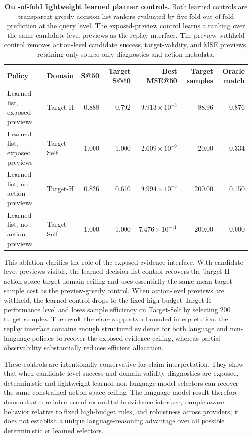 \documentclass[final,1p,times]{elsarticle}
\begin{document}
\begin{table}[htbp!]
\centering
\caption{\textbf{Out-of-fold lightweight learned planner controls.}
Both learned controls are transparent greedy decision-list rankers evaluated by five-fold out-of-fold prediction at the query level. The exposed-preview control learns a ranking over the same candidate-level previews as the replay interface. The preview-withheld control removes action-level candidate success, target-validity, and MSE previews, retaining only source-only diagnostics and action metadata.}
\label{tab:si_learned_preview_withheld_controls}
\small
\setlength{\tabcolsep}{4.2pt}
\renewcommand{\arraystretch}{1.12}
\begin{tabular}{llrrrrr}
\toprule
Policy & Domain & S@50 & Target S@50 & Best MSE@50 & Target samples & Oracle match \\
\midrule
Learned list, exposed previews & Target-H & 0.888 & 0.792 & $9.913\times10^{-3}$ & 88.96 & 0.876 \\
Learned list, exposed previews & Target-Self & 1.000 & 1.000 & $2.609\times10^{-9}$ & 20.00 & 0.334 \\
Learned list, no action previews & Target-H & 0.826 & 0.610 & $9.994\times10^{-3}$ & 200.00 & 0.150 \\
Learned list, no action previews & Target-Self & 1.000 & 1.000 & $7.476\times10^{-11}$ & 200.00 & 0.000 \\
\bottomrule
\end{tabular}
\end{table}

This ablation clarifies the role of the exposed evidence interface. With candidate-level previews visible, the learned decision-list control recovers the Target-H action-space target-domain ceiling and uses essentially the same mean target-sample cost as the preview-greedy control. When action-level previews are withheld, the learned control drops to the fixed high-budget Target-H performance level and loses sample efficiency on Target-Self by selecting 200 target samples. The result therefore supports a bounded interpretation: the replay interface contains enough structured evidence for both language and non-language policies to recover the exposed-evidence ceiling, whereas partial observability substantially reduces efficient allocation.

These controls are intentionally conservative for claim interpretation. They show that when candidate-level success and domain-validity diagnostics are exposed, deterministic and lightweight learned non-language-model selectors can recover the same constrained action-space ceiling. The language-model result therefore demonstrates reliable use of an auditable evidence interface, sample-aware behavior relative to fixed high-budget rules, and robustness across providers; it does not establish a unique language-reasoning advantage over all possible deterministic or learned selectors.
\end{document}

